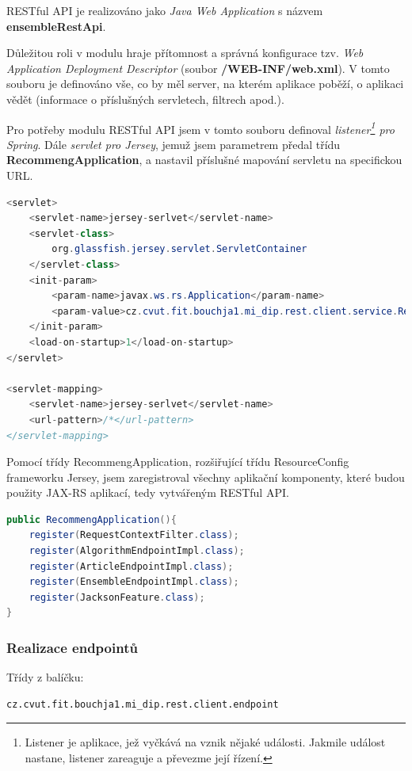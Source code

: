 \documentclass[thesis=M,czech]{FITthesis}[2014/05/07]
\begin{document}
RESTful API je realizováno jako \emph{Java Web Application} s názvem \textbf{ensembleRestApi}.

Důležitou roli v modulu hraje přítomnost a správná konfigurace tzv. \emph{Web Application Deployment Descriptor} (soubor \textbf{/WEB-INF/web.xml}). V tomto souboru je definováno vše, co by měl server, na kterém aplikace poběží, o aplikaci vědět (informace o příslušných servletech, filtrech apod.).

Pro potřeby modulu RESTful API jsem v tomto souboru definoval \emph{listener\footnote{Listener je aplikace, jež vyčkává na vznik nějaké události. Jakmile událost nastane, listener zareaguje a převezme její řízení.} pro Spring}. Dále \emph{servlet pro Jersey}, jemuž jsem parametrem předal třídu \textbf{RecommengApplication}, a nastavil příslušné mapování servletu na specifickou URL.

\begin{lstlisting}[language=java]
<servlet>
    <servlet-name>jersey-serlvet</servlet-name>
    <servlet-class>
        org.glassfish.jersey.servlet.ServletContainer
    </servlet-class>
    <init-param>
        <param-name>javax.ws.rs.Application</param-name>
        <param-value>cz.cvut.fit.bouchja1.mi_dip.rest.client.service.RecommengApplication</param-value>            
    </init-param>        
    <load-on-startup>1</load-on-startup>
</servlet>

<servlet-mapping>
    <servlet-name>jersey-serlvet</servlet-name>
    <url-pattern>/*</url-pattern>
</servlet-mapping>
\end{lstlisting}

Pomocí třídy RecommengApplication, rozšiřující třídu ResourceConfig frameworku Jersey, jsem zaregistroval všechny aplikační komponenty, které budou použity JAX-RS aplikací, tedy vytvářeným RESTful API.

\begin{lstlisting}[language=java]
public RecommengApplication(){
    register(RequestContextFilter.class);
    register(AlgorithmEndpointImpl.class);
    register(ArticleEndpointImpl.class);
    register(EnsembleEndpointImpl.class);
    register(JacksonFeature.class);        
}
\end{lstlisting}

\subsubsection{Realizace endpointů}
\label{sec:endpoints}
Třídy z balíčku:

\begin{verbatim}
cz.cvut.fit.bouchja1.mi_dip.rest.client.endpoint
\end{verbatim}
\end{document}

